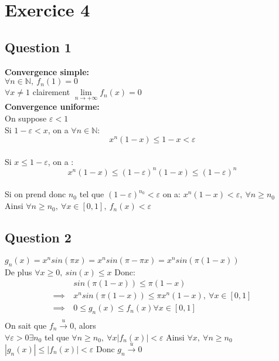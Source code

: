 \documentclass[td5.tex]{subfiles}
\begin{document}
\section{Exercice 4}
\subsection*{Question 1}

  \textbf{Convergence simple:}\\
  $\forall n \in \mathbb{N},~f_n(1) = 0$ \\
  $\forall x \ne 1$ clairement $\lim\limits_{n \to +\infty}f_n(x) = 0$\\
  \textbf{Convergence uniforme:}\\
  On suppose $\varepsilon < 1$\\
  Si $1 - \varepsilon < x$, on a $\forall n \in \mathbb{N}$:\\
  $$x^n(1-x)\leq 1 - x < \varepsilon$$\\
  Si $x \leq 1 - \varepsilon$, on a :
  $$x^n(1-x) \leq (1-\varepsilon)^n(1-x) \leq (1-\varepsilon)^n$$\\
  Si on prend donc $n_0$ tel que $(1-\varepsilon)^{n_0} < \varepsilon$ on a:
  $x^n(1-x) < \varepsilon,~\forall n \geq n_0 $\\
  Ainsi $\forall n \geq n_0,~\forall x \in [0, 1],~f_n(x) < \varepsilon$

\subsection{Question 2}
$g_n(x) = x^n sin(\pi x) = x^n sin(\pi - \pi x) = x^n sin(\pi(1-x))$\\
De plus $\forall x \geq 0,~ sin(x) \leq x$ Donc: \\
\begin{align*}
  &sin(\pi (1-x)) \leq \pi (1-x)  \\
  \implies ~&x^n sin (\pi(1-x)) \leq \pi x^n (1-x),~ \forall x \in [0, 1] \\
  \implies ~&0 \leq g_n(x) \leq f_n(x) \forall x \in [0, 1]\\
\end{align*}
On sait que $f_n \xrightarrow{u} 0$, alors \\
$\forall \varepsilon > 0 \exists n_0$ tel que $\forall n \geq n_0,~\forall x |f_n(x)| < \varepsilon$
Ainsi $\forall x, ~\forall n \geq n_0$\\
$|g_n(x)| \leq |f_n(x)| < \varepsilon$
Donc $g_n \xrightarrow{u} 0$
\end{document}
